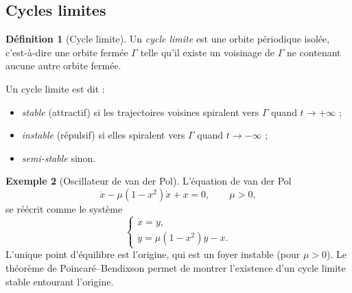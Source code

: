 \documentclass[12pt,a4paper,openany]{book}
\theoremstyle{definition}
\newtheorem{definition}{Définition}[chapter]
\newtheorem{exemple}[definition]{Exemple}
\theoremstyle{plain}
\theoremstyle{remark}
\begin{document}
\subsection{Cycles limites}
\label{subsec:cycles-limites}

\begin{definition}[Cycle limite]
\label{def:cycle-limite}
Un \emph{cycle limite} est une orbite
périodique isolée, c'est-à-dire une orbite fermée $\Gamma$ telle qu'il
existe un voisinage de $\Gamma$ ne contenant aucune autre orbite
fermée.

Un cycle limite est dit :
\begin{itemize}
  \item \emph{stable} (attractif) si les trajectoires voisines
        spiralent vers $\Gamma$ quand $t \to +\infty$ ;
  \item \emph{instable} (répulsif) si elles spiralent vers $\Gamma$
        quand $t \to -\infty$ ;
  \item \emph{semi-stable} sinon.
\end{itemize}
\end{definition}

\begin{exemple}[Oscillateur de van der Pol]
\label{ex:van-der-pol-cycle}
L'équation de van der Pol
\begin{equation}
\label{eq:van-der-pol}
\ddot{x} - \mu(1 - x^2)\dot{x} + x = 0, \qquad \mu > 0,
\end{equation}
se réécrit comme le système
\[
\begin{cases}
\dot{x} = y, \\
\dot{y} = \mu(1 - x^2)y - x.
\end{cases}
\]
L'unique point d'équilibre est l'origine, qui est un foyer instable
(pour $\mu > 0$). Le théorème de Poincaré--Bendixson permet de
montrer l'existence d'un cycle limite stable entourant l'origine.
\end{exemple}

\begin{center}
\end{center}
\end{document}
